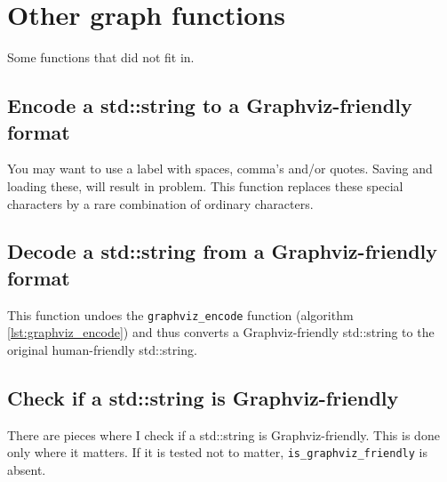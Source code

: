 \chapter{Other graph functions}
\label{sec:Other-graph-functions}

Some functions that did not fit in.

\section{Encode a std::string to a Graphviz-friendly format}
\label{subsec:graphviz_encode}

You may want to use a label with spaces, comma's and/or quotes.
Saving and loading these, will result in problem.
This function replaces these special characters by a rare combination of
ordinary characters.



\section{Decode a std::string from a Graphviz-friendly format}
\label{subsec:graphviz_decode}

This function undoes the \verb;graphviz_encode; function (algorithm 
\ref{lst:graphviz_encode}) and thus converts a 
Graphviz-friendly std::string to the original human-friendly std::string.



\section{Check if a std::string is Graphviz-friendly}
\label{subsec:is_graphviz_friendly}

There are pieces where I check if a std::string is Graphviz-friendly.
This is done only where it matters.
If it is tested not to matter, \verb;is_graphviz_friendly; is absent.



